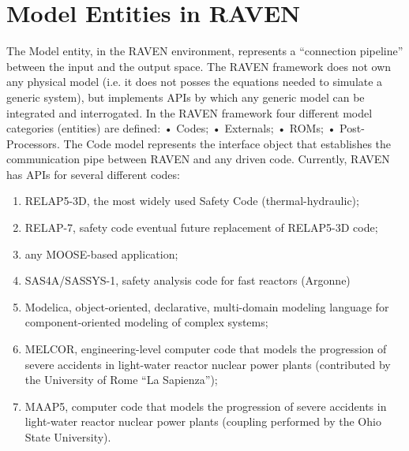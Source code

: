 \section{Model Entities in RAVEN}
\label{sec:models}
The Model entity, in the RAVEN environment, represents a ``connection pipeline'' between the input and the output space. The RAVEN framework does not own any 
physical model (i.e. it does not posses the equations needed to simulate a generic system), but implements APIs by which any generic model can be integrated and 
interrogated. In the RAVEN framework four different model categories (entities) are defined:
• Codes;
• Externals;
• ROMs;
• Post-Processors.
The Code model represents the interface object that establishes the communication pipe between RAVEN and any driven code. Currently, RAVEN has APIs for 
several different codes:
\begin{enumerate}
  \item RELAP5-3D, the most widely used Safety Code (thermal-hydraulic);
  \item RELAP-7, safety code eventual future replacement of RELAP5-3D code;
  \item any MOOSE-based application;
  \item SAS4A/SASSYS-1, safety analysis code for fast reactors (Argonne)
  \item Modelica, object-oriented, declarative, multi-domain modeling language for component-oriented modeling of complex systems;
  \item MELCOR, engineering-level computer code that models the progression of severe accidents in light-water reactor nuclear power plants (contributed by the 
           University of Rome “La Sapienza”);
  \item MAAP5, computer code that models the progression of severe accidents in light-water reactor nuclear power plants (coupling performed by the Ohio State 
          University).         
\end{enumerate}

